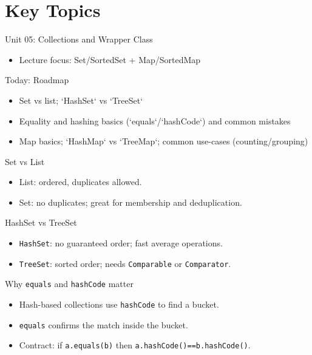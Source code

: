 \documentclass{beamer}
\begin{document}
\section{Key Topics}
\label{sec:concepts}

\begin{frame}{Unit 05: Collections and Wrapper Class}
  \begin{itemize}[<+->]
    \item Lecture focus: Set/SortedSet + Map/SortedMap
  \end{itemize}
  \slidesources{\OOPSUnitVSources}
\end{frame}

\begin{frame}{Today: Roadmap}
  \begin{itemize}[<+->]
    \item Set vs list; `HashSet` vs `TreeSet`
    \item Equality and hashing basics (`equals`/`hashCode`) and common mistakes
    \item Map basics; `HashMap` vs `TreeMap`; common use-cases (counting/grouping)
  \end{itemize}
  \slidesources{\OOPSUnitVSources}
\end{frame}

\begin{frame}{Set vs List}
  \begin{itemize}[<+->]
    \item List: ordered, duplicates allowed.
    \item Set: no duplicates; great for membership and deduplication.
  \end{itemize}
  \slidesources{\OOPSUnitVSources}
\end{frame}

\begin{frame}{HashSet vs TreeSet}
  \begin{itemize}[<+->]
    \item \texttt{HashSet}: no guaranteed order; fast average operations.
    \item \texttt{TreeSet}: sorted order; needs \texttt{Comparable} or \texttt{Comparator}.
  \end{itemize}
  \slidesources{\OOPSUnitVSources}
\end{frame}

\begin{frame}{Why \texttt{equals} and \texttt{hashCode} matter}
  \begin{itemize}[<+->]
    \item Hash-based collections use \texttt{hashCode} to find a bucket.
    \item \texttt{equals} confirms the match inside the bucket.
    \item Contract: if \texttt{a.equals(b)} then \texttt{a.hashCode()==b.hashCode()}.
  \end{itemize}
  \slidesources{\OOPSUnitVSources}
\end{frame}
\end{document}
